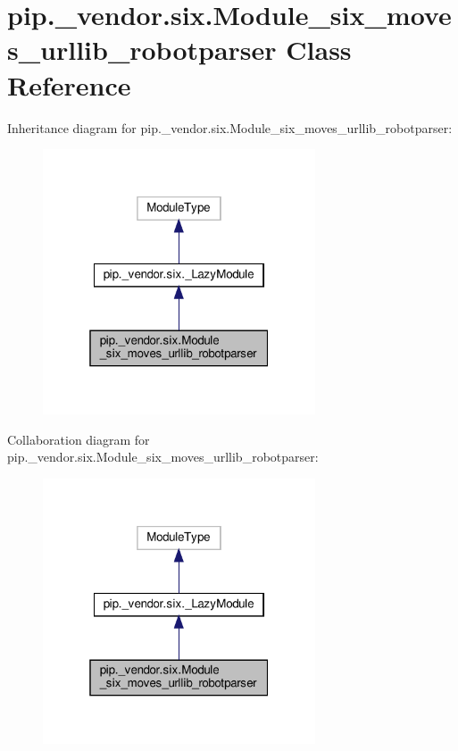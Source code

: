 \hypertarget{classpip_1_1__vendor_1_1six_1_1Module__six__moves__urllib__robotparser}{}\section{pip.\+\_\+vendor.\+six.\+Module\+\_\+six\+\_\+moves\+\_\+urllib\+\_\+robotparser Class Reference}
\label{classpip_1_1__vendor_1_1six_1_1Module__six__moves__urllib__robotparser}


Inheritance diagram for pip.\+\_\+vendor.\+six.\+Module\+\_\+six\+\_\+moves\+\_\+urllib\+\_\+robotparser\+:
\nopagebreak
\begin{figure}[H]
\begin{center}
\leavevmode
\includegraphics[width=229pt]{classpip_1_1__vendor_1_1six_1_1Module__six__moves__urllib__robotparser__inherit__graph}
\end{center}
\end{figure}


Collaboration diagram for pip.\+\_\+vendor.\+six.\+Module\+\_\+six\+\_\+moves\+\_\+urllib\+\_\+robotparser\+:
\nopagebreak
\begin{figure}[H]
\begin{center}
\leavevmode
\includegraphics[width=229pt]{classpip_1_1__vendor_1_1six_1_1Module__six__moves__urllib__robotparser__coll__graph}
\end{center}
\end{figure}

